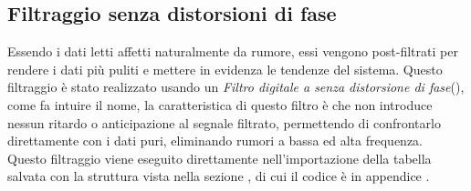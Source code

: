 \subsection{Filtraggio senza distorsioni di fase}
Essendo i dati letti affetti naturalmente da rumore, essi vengono post-filtrati per rendere i dati più puliti e mettere in evidenza le tendenze del sistema. Questo filtraggio è stato realizzato usando un \textit{Filtro digitale a senza distorsione di fase}(\cite{zeroPhaseShiftFilter}), come fa intuire il nome, la caratteristica di questo filtro è che non introduce nessun ritardo o anticipazione al segnale filtrato, permettendo di confrontarlo direttamente con i dati puri, eliminando rumori a bassa ed alta frequenza.\\
Questo filtraggio viene eseguito direttamente nell'importazione della tabella salvata con la struttura vista nella sezione , di cui il codice è in appendice .